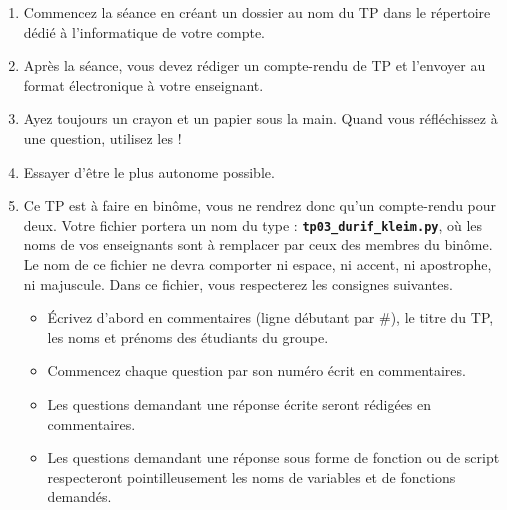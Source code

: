 \begin{enumerate}
\item Commencez la séance en créant un dossier au nom du TP dans le répertoire dédié à l'informatique de votre compte. 
\item Après la séance, vous devez rédiger un compte-rendu de TP et
l'envoyer au format électronique à votre enseignant.
\item Ayez toujours un crayon et un papier sous la main. Quand vous réfléchissez à une question, utilisez les !
\item Essayer d'être le plus autonome possible. 
\item Ce TP est à faire en binôme, vous ne rendrez donc qu'un  compte-rendu pour deux.
Votre fichier portera un nom du type : \textbf{\texttt{tp03\_durif\_kleim.py}}, où les noms de vos enseignants sont à remplacer par ceux des membres du binôme. Le nom de ce 
fichier ne devra comporter ni espace, ni accent, ni apostrophe, ni majuscule.
Dans ce fichier, vous respecterez les consignes suivantes.
\begin{itemize}
  \item \'Ecrivez d'abord en commentaires (ligne débutant par \#), le titre du TP, les noms et prénoms des étudiants du groupe.
  \item Commencez chaque question par son numéro écrit en commentaires.
  \item Les questions demandant une réponse écrite seront rédigées en commentaires.
  \item Les questions demandant une réponse sous forme de fonction ou de script respecteront pointilleusement les noms de variables et de fonctions demandés.
\end{itemize}
\end{enumerate}


